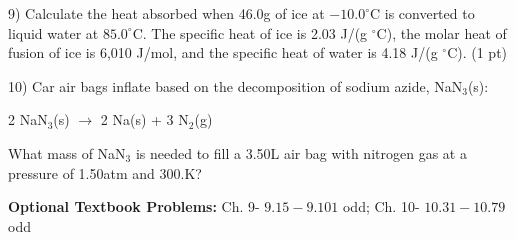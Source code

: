 \documentclass[12pt]{article}
\begin{document}
\vspace{1.5in}

9) Calculate the heat absorbed when 46.0g of ice at $-10.0^\circ$C is converted to liquid
water at $85.0^\circ$C. The specific heat of ice is 2.03 J/(g $^\circ$C), the molar heat
of fusion of ice is 6,010 J/mol, and the specific heat of water is 4.18 J/(g $^\circ$C).
(1 pt)

\vspace{2in}

10) Car air bags inflate based on the decomposition of sodium azide, NaN$_3$(s):

2 NaN$_3$(s) $\rightarrow$ 2 Na(s) + 3 N$_2$(g)

What mass of NaN$_3$ is needed to fill a 3.50L air bag with nitrogen gas at a pressure
of 1.50atm and 300.K?

\vfill

\textbf{Optional Textbook Problems:} Ch. 9- $9.15 - 9.101$ odd; Ch. 10- $10.31 - 10.79$
odd
\end{document}
